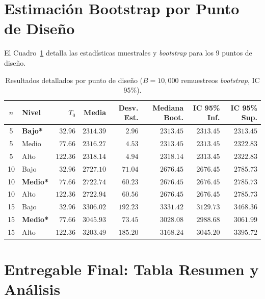 \documentclass[11pt,letterpaper]{article}
\begin{document}
\section{\color{rojouanl} Estimación Bootstrap por Punto de Diseño}

El Cuadro~\ref{tab:bootstrap_all} detalla las estadísticas muestrales y \textit{bootstrap} para los 9 puntos de diseño.

\begin{table}[H]
\centering
\caption{Resultados detallados por punto de diseño ($B = 10{,}000$ remuestreos \textit{bootstrap}, IC 95\%).}
\label{tab:bootstrap_all}
\begin{tabular}{@{}clrrrrrr@{}}
\toprule
\textbf{$n$} & \textbf{Nivel} & \textbf{$T_0$} & \textbf{Media} & \textbf{Desv. Est.} & \textbf{Mediana Boot.} & \textbf{IC 95\% Inf.} & \textbf{IC 95\% Sup.} \\
\midrule
5  & \textcolor{rojouanl}{\textbf{Bajo*}}  & $32.96$  & $2314.39$ & $2.96$   & $\mathbf{2313.45}$ & $2313.45$ & $2313.45$ \\
5  & Medio                                 & $77.66$  & $2316.27$ & $4.53$   & $2313.45$          & $2313.45$ & $2322.83$ \\
5  & Alto                                  & $122.36$ & $2318.14$ & $4.94$   & $2318.14$          & $2313.45$ & $2322.83$ \\
\midrule
10 & Bajo                                  & $32.96$  & $2727.10$ & $71.04$  & $2676.45$          & $2676.45$ & $2785.73$ \\
10 & \textcolor{rojouanl}{\textbf{Medio*}} & $77.66$  & $2722.74$ & $60.23$  & $\mathbf{2676.45}$ & $2676.45$ & $2785.73$ \\
10 & Alto                                  & $122.36$ & $2722.94$ & $60.56$  & $2676.45$          & $2676.45$ & $2785.73$ \\
\midrule
15 & Bajo                                  & $32.96$  & $3306.02$ & $192.23$ & $3331.42$          & $3129.73$ & $3468.36$ \\
15 & \textcolor{rojouanl}{\textbf{Medio*}} & $77.66$  & $3045.93$ & $73.45$  & $\mathbf{3028.08}$ & $2988.68$ & $3061.99$ \\
15 & Alto                                  & $122.36$ & $3203.49$ & $185.20$ & $3168.24$          & $3045.20$ & $3395.72$ \\
\bottomrule
\end{tabular}
\end{table}

\section{\color{rojouanl} Entregable Final: Tabla Resumen y Análisis}
\end{document}

